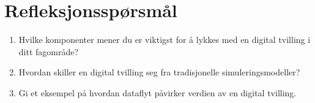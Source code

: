 \section{Refleksjonsspørsmål}
\begin{enumerate}
    \item Hvilke komponenter mener du er viktigst for å lykkes med en digital tvilling i ditt fagområde?
    \item Hvordan skiller en digital tvilling seg fra tradisjonelle simuleringsmodeller?
    \item Gi et eksempel på hvordan dataflyt påvirker verdien av en digital tvilling.
\end{enumerate}

